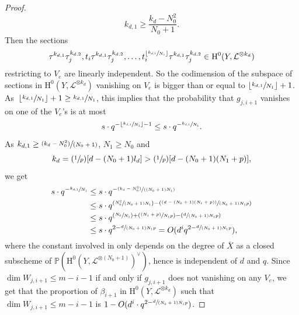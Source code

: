 \documentclass[JEP,XML,SOM,Unicode,published]{cedram}
\newcommand{\Psfrac}[2]{(\sfrac{#1}{#2})}
\newcommand{\Ppsfrac}[2]{(\sfrac{(#1)}{#2})}
\newcommand{\pspfrac}[2]{\sfrac{(#1)}{(#2)}}
\theoremstyle{plain}
\theoremstyle{definition}
\newcommand{\ho}{\mathrm{H}}
\newcommand{\li}{\mathcal{L}}
\newcommand{\pr}{\mathbb{P}}
\begin{document}
\begin{proof}[Proof]
\[
k_{d,1}\geq \frac{k_d-N_0^2}{N_0+1}.
\]
Then the sections
\[
\tau^{k_{d,1}}\tau_j^{k_{d,2}}, t_i\tau^{k_{d,1}}\tau_j^{k_{d,2}},\dots, t_i^{\lfloor \sfrac{k_{d,1}}{N_1} \rfloor}\tau^{k_{d,1}}\tau_j^{k_{d,2}}\in \ho^0(Y, \li^{\otimes k_d})
\]
restricting to $V_e$ are linearly independent. So the codimension of the subspace of sections in $\ho^0(Y, \li^{\otimes k_d})$ vanishing on $V_e$ is bigger than or equal to $\lfloor \sfrac{k_{d,1}}{N_1} \rfloor+1$. As~$\lfloor \sfrac{k_{d,1}}{N_1} \rfloor+1\geq \sfrac{k_{d,1}}{N_1} $, this implies that the probability that $g_{j, i+1}$ vanishes on one of the $V_e$'s is at most
\[
s\cdot q^{-\lfloor \sfrac{k_{d,1}}{N_1} \rfloor-1}\leq s\cdot q^{-\sfrac{k_{d,1}}{N_1}}.
\]
As $k_{d,1}\geq \pspfrac{k_d-N_0^2}{N_0+1}$, $N_1\geq N_0$ and
\[
k_d=\Psfrac{1}{p}[d-(N_0+1)l_d]>\Psfrac{1}{p}[d-(N_0+1)(N_1+p)],
\]
we get
\begin{align*}
s\cdot q^{- \sfrac{k_{d,1}}{N_1}}&\leq s\cdot q^{-\pspfrac{k_d-N_0^2}{(N_0+1)N_1}}\\
&\leq s\cdot q^{\Psfrac{N_0^2}{(N_0+1)N_1}-\Ppsfrac{d-(N_0+1)(N_1+p)}{ (N_0+1)N_1p}}\\
&\leq s\cdot q^{\Psfrac{N_0}{N_1}+\Ppsfrac{N_1+p}{N_1p}-\Psfrac{d}{ (N_0+1)N_1p}}\\
&\leq s\cdot q^{2-\sfrac{d}{ (N_0+1)N_1p}}=O(d^i q^{2-\sfrac{d}{ (N_0+1)N_1p}}),
\end{align*}
where the constant involved in only depends on the degree of $\overline{X}$ as a closed subscheme of $\pr(\ho^0(Y, \li^{\otimes (N_0+1)})^{\vee})$, hence is independent of $d$ and $q$. Since $\dim W_{j,i+1} \leq m-i-1$ if and only if $g_{j,i+1}$ does not vanishing on any $V_e$, we get that the proportion of $\beta_{i+1}$ in $\ho^0(Y,\mathcal{L}^{\otimes k_d})$ such that $\dim W_{j,i+1} \leq m-i-1$ is $1-O(d^i\cdot q^{2-\sfrac{d}{(N_0+1)N_1p}})$.
\end{proof}
\end{document}
